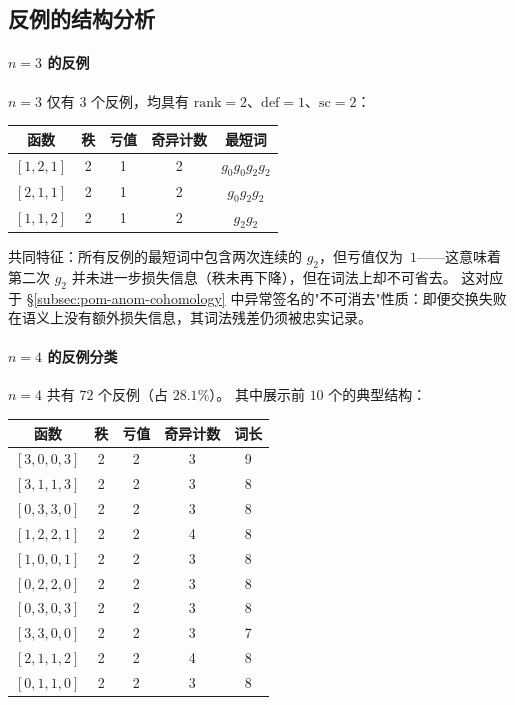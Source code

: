 \subsection{反例的结构分析}

\paragraph{$n=3$ 的反例}
$n=3$ 仅有 $3$ 个反例，均具有 $\mathrm{rank}=2$、$\mathrm{def}=1$、$\mathrm{sc}=2$：

\begin{center}
\begin{tabular}{c|c|c|c|c}
\toprule
函数 & 秩 & 亏值 & 奇异计数 & 最短词 \\
\midrule
$[1,2,1]$ & 2 & 1 & 2 & $g_0 g_0 g_2 g_2$ \\
$[2,1,1]$ & 2 & 1 & 2 & $g_0 g_2 g_2$ \\
$[1,1,2]$ & 2 & 1 & 2 & $g_2 g_2$ \\
\bottomrule
\end{tabular}
\end{center}

\noindent
共同特征：所有反例的最短词中包含两次连续的 $g_2$，但亏值仅为~$1$——这意味着第二次 $g_2$ 并未进一步损失信息（秩未再下降），但在词法上却不可省去。
这对应于 \S\ref{subsec:pom-anom-cohomology} 中异常签名的"不可消去"性质：即便交换失败在语义上没有额外损失信息，其词法残差仍须被忠实记录。

\paragraph{$n=4$ 的反例分类}
$n=4$ 共有 $72$ 个反例（占 $28.1\%$）。
其中展示前 $10$ 个的典型结构：

\begin{center}
\begin{tabular}{c|c|c|c|c}
\toprule
函数 & 秩 & 亏值 & 奇异计数 & 词长 \\
\midrule
$[3,0,0,3]$ & 2 & 2 & 3 & 9 \\
$[3,1,1,3]$ & 2 & 2 & 3 & 8 \\
$[0,3,3,0]$ & 2 & 2 & 3 & 8 \\
$[1,2,2,1]$ & 2 & 2 & 4 & 8 \\
$[1,0,0,1]$ & 2 & 2 & 3 & 8 \\
$[0,2,2,0]$ & 2 & 2 & 3 & 8 \\
$[0,3,0,3]$ & 2 & 2 & 3 & 8 \\
$[3,3,0,0]$ & 2 & 2 & 3 & 7 \\
$[2,1,1,2]$ & 2 & 2 & 4 & 8 \\
$[0,1,1,0]$ & 2 & 2 & 3 & 8 \\
\bottomrule
\end{tabular}
\end{center}

